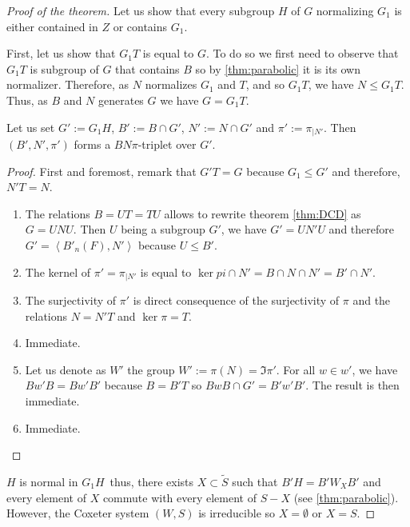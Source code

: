 \begin{proof}[Proof of the theorem]

Let us show that every subgroup $H$ of $G$ normalizing $G_1$ is either contained in $Z$ or contains $G_1$.

    First, let us show that $G_1T$ is equal to $G$. To do so we first need to observe that $G_1T$ is subgroup of $G$ that contains $B$ so by \ref{thm:parabolic} it is its own normalizer. Therefore, as $N$ normalizes $G_1$ and $T$, and so $G_1T$, we have $N \le G_{1}T$. Thus, as $B$ and $N$ generates $G$ we have $G = G_1T$.

    \begin{lemme} \label{lem:subBN}
        Let us set $G' := G_1 H$, $B' := B \cap G'$, $N' := N \cap G'$ and $\pi' := \pi_{|N'}$. 
        Then $\left( B', N', \pi' \right)$ forms a $BN\pi$-triplet over $G'$.
    \end{lemme}
    \begin{proof}
        First and foremost, remark that $G'T = G$ because $G_1 \le G'$ and therefore, $N'T = N$.
        \begin{enumerate}
            \item The relations $B=UT=TU$ allows to rewrite theorem \ref{thm:DCD} as $G = UNU$. Then $U$ being a subgroup $G'$, we have $G' = UN'U$ and therefore $G' = \left<B'_n(F),N' \right>$ because $U \le B'$.
            \item The kernel of $\pi' = \pi_{|N'}$ is equal to $\ker pi \cap N' = B \cap N \cap N' = B' \cap N' $.
            \item The surjectivity of $\pi'$ is direct consequence of the surjectivity of $\pi$ and the relations $N=N'T$ and $\ker \pi = T$.
            \item Immediate.
            \item Let us denote as $W'$ the group $W' := \pi (N) =  \Im \pi'$. For all $w \in w'$, we have $Bw'B = Bw'B'$ because $B = B'T$ so $BwB \cap G' = B'w'B'$. The result is then immediate.
            \item Immediate.
        \end{enumerate}
    \end{proof}

   $H$ is normal in $G_1 H$\ thus, there exists $X \subset \tilde{S}$ such that $B'H = B' W_X B'$ and every element of $X$ commute with every element of $S-X$ (see \ref{thm:parabolic}). However, the Coxeter system $\left( W,S \right)$ is irreducible so $X = \emptyset$ or $X = S$.


\end{proof}
